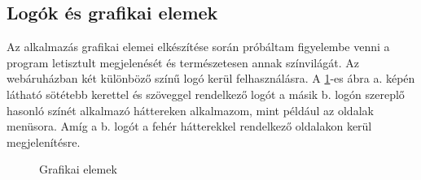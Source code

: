 \subsection{Logók és grafikai elemek}
Az alkalmazás grafikai elemei elkészítése során próbáltam figyelembe venni a program letisztult megjelenését és természetesen annak színvilágát. Az webáruházban két különböző színű logó kerül felhasználásra. A \ref{fig.picture-12}-es ábra a. képén látható sötétebb kerettel és szöveggel rendelkező logót a másik b. logón szereplő hasonló színét alkalmazó háttereken alkalmazom, mint például az oldalak menüsora. Amíg a b. logót a fehér hátterekkel rendelkező oldalakon kerül megjelenítésre.
\begin{figure}[H]
	\centering
	\hspace{5pt}
	\caption{Grafikai elemek}
	\label{fig.picture-12}
\end{figure}

